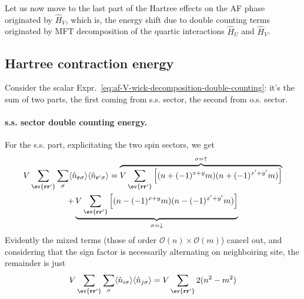 Let us now move to the last part of the Hartree effects on the AF phase originated by $\hat H_V$, which is, the energy shift due to double counting terms originated by MFT decomposition of the quartic interactions $\hat H_U$ and $\hat H_V$.

\subsection{Hartree contraction energy}\label{subsec:af-hartree-energy}

Consider the scalar Expr.~\eqref{eq:af-V-wick-decomposition-double-counting}: it's the sum of two parts, the first coming from s.s. sector, the second from o.s. sector.

\paragraph{s.s. sector double counting energy.}

For the s.s. part, explicitating the two spin sectors, we get
\begin{multline*}
	V \sum_{\ev{\mathbf{r}\mathbf{r}'}} \sum_\sigma \langle
		\hat n_{\mathbf{r}\sigma}
	\rangle \langle
		\hat n_{\mathbf{r}'\sigma}
	\rangle = \overbrace{
		V \sum_{\ev{\mathbf{r}\mathbf{r}'}} \left[
			(
				n + (-1)^{x+y} m
			) (
				n + (-1)^{x'+y'} m
			)
		\right]
	}^{\sigma=\uparrow} \\
	+ \underbrace{
		V \sum_{\ev{\mathbf{r}\mathbf{r}'}} \left[
			(
				n - (-1)^{x+y} m
			) (
				n - (-1)^{x'+y'} m
			)
		\right]
	}_{\sigma=\downarrow}
\end{multline*}
Evidently the mixed terms (those of order $\mathcal{O}(n)\times\mathcal{O}(m)$) cancel out, and considering that the sign factor is necessarily alternating on neighboiring site, the remainder is just
\[
	V \sum_{\ev{\mathbf{r}\mathbf{r}'}} \sum_\sigma \langle
		\hat n_{i\sigma}
	\rangle \langle
		\hat n_{j\sigma}
	\rangle = V \sum_{\ev{\mathbf{r}\mathbf{r}'}} 2(
		n^2-m^2
	)
\]

